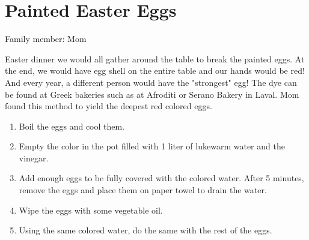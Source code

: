 \chapter{Painted Easter Eggs}
\label{ch:eastereggs}


Family member: Mom


 Easter dinner we would all gather around the table to break the painted eggs. At the end, we would have egg shell on the entire table and our hands would be red! And every year, a different person would have the "strongest" egg!     The dye can be found at Greek bakeries such as at Afroditi or Serano Bakery in Laval. Mom found this method to yield the deepest red colored eggs.

\begin{enumerate}
    \item Boil the eggs and cool them.
    \item Empty the color in the pot filled with 1 liter of lukewarm water and the vinegar.
    \item Add enough eggs to be fully covered with the colored water. After 5 minutes, remove the eggs and place them on paper towel to drain the water.
    \item Wipe the eggs with some vegetable oil.
    \item Using the same colored water, do the same with the rest of the eggs.
\end{enumerate}

